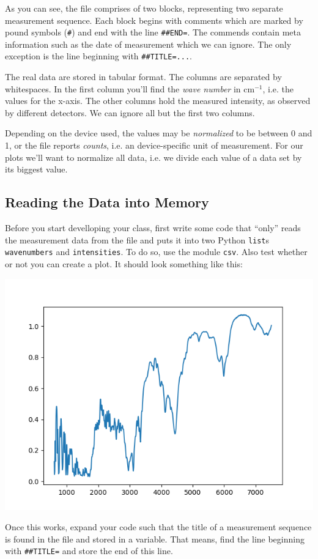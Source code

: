\documentclass[
	english,
	fontsize=10pt,
	parskip=half,
	titlepage=true,
	DIV=12
]{scrartcl}
\newcommand*{\inPy}[1]{\texttt{#1}}
\newcommand*{\ie}{i.\;e. }
\begin{document}
As you can see, the file comprises of two blocks, representing two separate measurement sequence. Each block begins with comments which are marked by pound symbols  (\texttt{\#}) and end with the line \texttt{\#\#END=}. The commends contain meta information such as the date of measurement which we can ignore. The only exception is the line beginning with \texttt{\#\#TITLE=...}.

The real data are stored in tabular format. The columns are separated by whitespaces. In the first column you'll find the \emph{wave number} in $\text{cm}^{-1}$, \ie the values for the x-axis. The other columns hold the measured intensity, as observed by different detectors. We can ignore all but the first two columns.

Depending on the device used, the values may be \emph{normalized} to be between 0 and 1, or the file reports \emph{counts}, \ie an device-specific unit of measurement. For our plots we'll want to normalize all data, \ie we divide each value of a data set by its biggest value.

\subsection{Reading the Data into Memory}
Before you start develloping your class, first write some code that \enquote{only} reads the measurement data from the file and puts it into two Python \inPy{list}s \texttt{wavenumbers} and \texttt{intensities}. To do so, use the module \texttt{csv}. Also test whether or not you can create a plot. It should look something like this:

\begin{center}
	\includegraphics[width=.6\linewidth]{./spectrum-pre}
\end{center}

Once this works, expand your code such that the title of a measurement sequence is found in the file and stored in a variable. That means, find the line beginning with  \texttt{\#\#TITLE=} and store the end of this line.
\end{document}
